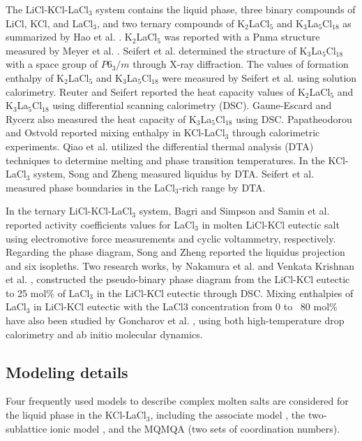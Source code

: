 The LiCl-KCl-LaCl$_3$ system contains the liquid phase, three binary compounds of LiCl, KCl, and LaCl$_3$, and two ternary compounds of K$_2$LaCl$_5$ and K$_3$La$_5$Cl$_{18}$ as summarized by Hao et al. \cite{hao2024thermodynamic}. K$_2$LaCl$_5$ was reported with a Pnma structure measured by Meyer et al. \cite{meyer1983k2mcl5}. Seifert et al. \cite{seifert1985thermodynamic} determined the structure of K$_3$La$_5$Cl$_{18}$ with a space group of $P6_3/m$ through X-ray diffraction. The values of formation enthalpy of K$_2$LaCl$_5$ and K$_3$La$_5$Cl$_{18}$ were measured by Seifert et al. \cite{seifert1985thermodynamic} using solution calorimetry. Reuter and Seifert \cite{reuter1994heat} reported the heat capacity values of K$_2$LaCl$_5$ and K$_3$La$_5$Cl$_{18}$ using differential scanning calorimetry (DSC). Gaune-Escard and Rycerz \cite{gaune1999heat} also measured the heat capacity of K$_3$La$_5$Cl$_{18}$ using DSC. Papatheodorou and Ostvold \cite{papatheodorou1974thermodynamic} reported mixing enthalpy in KCl-LaCl$_3$ through calorimetric experiments. Qiao et al. \cite{qiao1989measurement} utilized the differential thermal analysis (DTA) techniques to determine melting and phase transition temperatures. In the KCl-LaCl$_3$ system, Song and Zheng \cite{song1995investigation} measured liquidus by DTA. Seifert et al. \cite{seifert1985thermodynamic} measured phase boundaries in the LaCl$_3$-rich range by DTA.

In the ternary LiCl-KCl-LaCl$_3$ system, Bagri and Simpson \cite{bagri2016determination} and Samin et al. \cite{samin2016estimation} reported activity coefficients values for LaCl$_3$ in molten LiCl-KCl eutectic salt using electromotive force measurements and cyclic voltammetry, respectively. Regarding the phase diagram, Song and Zheng \cite{song1995investigation} reported the liquidus projection and six isopleths. Two research works, by Nakamura et al. \cite{nakamura1997thermal} and Venkata Krishnan et al. \cite{venkata2006pseudo}, constructed the pseudo-binary phase diagram from the LiCl-KCl eutectic to 25 mol\% of LaCl$_3$ in the LiCl-KCl eutectic through DSC. Mixing enthalpies of LaCl$_3$ in LiCl-KCl eutectic with the LaCl3 concentration from 0 to ~80 mol\% have also been studied by Goncharov et al. \cite{Goncharov2024}, using both high-temperature drop calorimetry and ab initio molecular dynamics. 

\subsection{Modeling details} \label{moltensalts:ssec:LaCl3model}
Four frequently used models to describe complex molten salts are considered for the liquid phase in the KCl-LaCl$_3$, including the associate model \cite{sommer1982association}, the two-sublattice ionic model \cite{hillert1985two}, and the MQMQA \cite{pelton2001modified} (two sets of coordination numbers). 

